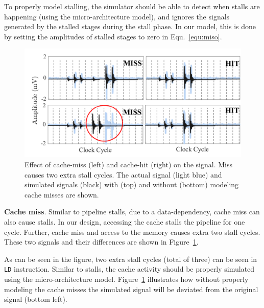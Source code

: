 \documentclass[11 pt]{article}
\begin{document}
To properly model stalling, the simulator should be able to detect when stalls are happening (using the micro-architecture model), and ignores the signals generated by the stalled stages during the stall phase. In our model, this is done by setting the amplitudes of stalled stages to zero in Equ.~\ref{equ:miso}.\\
\begin{figure}
	\centering
	\includegraphics[width=0.4\columnwidth,clip]{figure/cache2.pdf}
	\caption{Effect of cache-miss (left) and cache-hit (right) on the signal. Miss causes two extra stall cycles. The actual signal (light blue) and simulated signals (black) with (top) and without (bottom) modeling cache misses are shown. }
	\label{fig:cache}
\end{figure}

\noindent\textbf{Cache miss}. Similar to pipeline stalls, due to a data-dependency, cache miss can also cause stalls. In our design, accessing the cache stalls the pipeline for one cycle. Further, cache miss and access to the memory causes extra two stall cycles. These two signals and their differences are shown in Figure~\ref{fig:cache}.

As can be seen in the figure, two extra stall cycles (total of three) can be seen in {\tt LD} instruction. Similar to stalls, the cache activity should be properly simulated using the micro-architecture model. Figure~\ref{fig:cache} illustrates how without properly modeling the cache misses the simulated signal will be deviated from the original signal (bottom left).    \\
\end{document}
